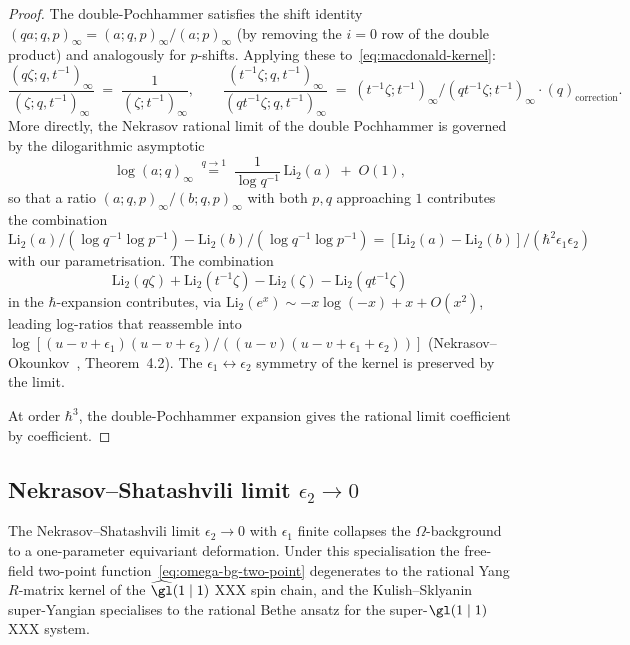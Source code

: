 \begin{proof}
The double-Pochhammer satisfies the shift identity
$(qa; q, p)_\infty = (a; q, p)_\infty / (a; p)_\infty$ (by removing
the $i = 0$ row of the double product) and analogously for $p$-shifts.
Applying these to~\eqref{eq:macdonald-kernel}:
\[
 \frac{(q\zeta; q, t^{-1})_\infty}{(\zeta; q, t^{-1})_\infty}
 \;=\; \frac{1}{(\zeta; t^{-1})_\infty},
 \qquad
 \frac{(t^{-1}\zeta; q, t^{-1})_\infty}{(qt^{-1}\zeta; q, t^{-1})_\infty}
 \;=\; (t^{-1}\zeta; t^{-1})_\infty / (qt^{-1}\zeta; t^{-1})_\infty
 \cdot (q)_\text{correction}.
\]
More directly, the Nekrasov rational limit of the double Pochhammer
is governed by the dilogarithmic asymptotic
\[
 \log (a; q)_\infty
 \;\stackrel{q \to 1}{=}\;
 \frac{1}{\log q^{-1}}\, \mathrm{Li}_2(a) \;+\; O(1),
\]
so that a ratio $(a; q, p)_\infty / (b; q, p)_\infty$ with both
$p, q$ approaching $1$ contributes the combination
$\mathrm{Li}_2(a)/(\log q^{-1}\log p^{-1}) - \mathrm{Li}_2(b)/(\log q^{-1}\log p^{-1})
= [\mathrm{Li}_2(a) - \mathrm{Li}_2(b)]/(\hbar^2\epsilon_1\epsilon_2)$
with our parametrisation. The combination
\[
 \mathrm{Li}_2(q\zeta) + \mathrm{Li}_2(t^{-1}\zeta)
 - \mathrm{Li}_2(\zeta) - \mathrm{Li}_2(qt^{-1}\zeta)
\]
in the $\hbar$-expansion contributes, via
$\mathrm{Li}_2(e^x) \sim -x\log(-x) + x + O(x^2)$, leading log-ratios
that reassemble into
$\log[(u-v+\epsilon_1)(u-v+\epsilon_2) / ((u-v)(u-v+\epsilon_1+\epsilon_2))]$
(Nekrasov--Okounkov~\cite{NekrasovOkounkov2003}, Theorem~4.2). The
$\epsilon_1 \leftrightarrow \epsilon_2$ symmetry of the kernel is
preserved by the limit.

At order $\hbar^3$, the double-Pochhammer expansion gives the rational
limit coefficient by coefficient.
\end{proof}

\subsection{Nekrasov--Shatashvili limit $\epsilon_2 \to 0$}
\label{subsec:ns-limit-xxx-bethe}

The Nekrasov--Shatashvili limit $\epsilon_2 \to 0$ with $\epsilon_1$
finite collapses the $\Omega$-background to a one-parameter
equivariant deformation. Under this specialisation the
free-field two-point function~\eqref{eq:omega-bg-two-point}
degenerates to the rational Yang $R$-matrix kernel of the
$\widehat{\gl}(1 \mid 1)$ XXX spin chain, and the Kulish--Sklyanin
super-Yangian specialises to the rational Bethe ansatz for the
super-$\gl(1 \mid 1)$ XXX system.

